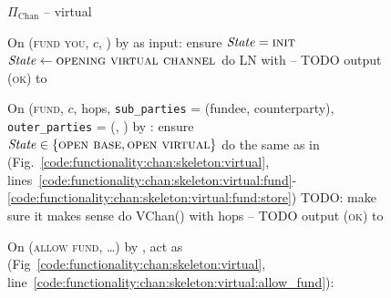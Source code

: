 \begin{figure}[H]
  \begin{protocolbox}{$\Pi_{\mathrm{Chan}}$ -- virtual}
    \begin{algorithmic}[1]
      \State {}
      \State {}
      \State On (\textsc{fund you}, $c$, \bob) by \charlie as input:
      \Indent
        \State ensure $\mathit{State} = \textsc{init}$
        \State $\mathit{State} \gets \textsc{opening virtual channel}$
        \State do LN with \bob{} -- TODO
        \State output (\textsc{ok}) to \charlie
      \EndIndent
      \Statex

      \State On (\textsc{fund}, $c$, hops, \texttt{sub\_parties} = (fundee,
      counterparty), \texttt{outer\_parties} = (\charlie, \dave) by
      \environment:
      \Indent
        \State ensure $\mathit{State} \in \{\textsc{open base}, \textsc{open
        virtual}\}$
        \State do the same as in \fchan
        (Fig.~\ref{code:functionality:chan:skeleton:virtual},
        lines~\ref{code:functionality:chan:skeleton:virtual:fund}-\ref{code:functionality:chan:skeleton:virtual:fund:store})
        TODO: make sure it makes sense
        \State do VChan() with hops -- TODO 
        \State output (\textsc{ok}) to \environment
      \EndIndent
      \Statex

      \State {}
      \State On (\textsc{allow fund}, \dots) by \charlie, act as \fchan
      (Fig~\ref{code:functionality:chan:skeleton:virtual},
      line~\ref{code:functionality:chan:skeleton:virtual:allow_fund}):
    \end{algorithmic}
  \end{protocolbox}
  \caption{}
  \label{code:protocol:chan:skeleton:virtual}
\end{figure}
